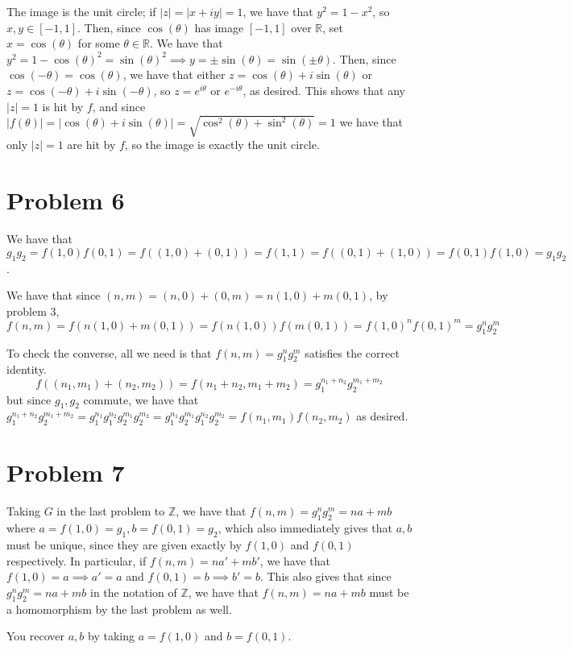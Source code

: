 \documentclass[12pt,letterpaper]{article}
\theoremstyle{definition}
\newcommand{\R}{\mathbb{R}}
\newcommand{\Z}{\mathbb{Z}}
\begin{document}
The image is the unit circle; if $|z| = |x + iy| = 1$, we have that $y^2 = 1 - x^2$, so $x,y \in [-1,1]$. Then, since $\cos(\theta)$ has image $[-1,1]$ over $\R$, set $x = \cos(\theta)$ for some $\theta \in \R$. We have that $y^2 = 1 - \cos(\theta)^2 = \sin(\theta)^2 \implies y = \pm \sin(\theta) = \sin(\pm \theta)$. Then, since $\cos(-\theta) = \cos(\theta)$, we have that either $z = \cos(\theta) + i\sin(\theta)$ or $z = \cos(-\theta) + i\sin(-\theta)$, so $z = e^{i\theta}$ or $e^{-i\theta}$, as desired. This shows that any $|z| = 1$ is hit by $f$, and since $|f(\theta)| = |\cos(\theta) + i\sin(\theta)| = \sqrt{\cos^2(\theta) + \sin^2(\theta)} = 1$ we have that only $|z| = 1$ are hit by $f$, so the image is exactly the unit circle.

\section*{Problem 6}

We have that $g_1g_2 = f(1,0)f(0,1) = f((1,0) + (0,1)) = f(1,1) = f((0,1) + (1,0)) = f(0,1)f(1,0) = g_1g_2$.

We have that since $(n,m) = (n,0) + (0,m) = n(1,0) + m(0,1)$, by problem 3,
\[
  f(n,m) = f(n(1,0) + m(0,1)) = f(n(1,0))f(m(0,1)) = f(1,0)^nf(0,1)^m = g_1^ng_2^m
\]

To check the converse, all we need is that $f(n,m) = g_1^ng_2^m$ satisfies the correct identity.
\[
  f((n_1,m_1) + (n_2, m_2)) = f(n_1 + n_2, m_1 + m_2) = g_1^{n_1+n_2}g_2^{m_1+m_2}
\]
but since $g_1, g_2$ commute, we have that $g_1^{n_1+n_2}g_2^{m_1+m_2} = g_1^{n_1}g_1^{n_2}g_2^{m_1}g_2^{m_2} = g_1^{n_1}g_2^{m_1}g_1^{n_2}g_2^{m_2} = f(n_1,m_1)f(n_2,m_2)$ as desired.

\section*{Problem 7}

Taking $G$ in the last problem to $\Z$, we have that $f(n,m) = g_1^ng_2^m = na + mb$ where $a = f(1,0) = g_{1}, b = f(0,1) = g_{2}$, which also immediately gives that $a, b$ must be unique, since they are given exactly by $f(1,0)$ and $f(0,1)$ respectively. In particular, if $f(n,m) = na' + mb'$, we have that $f(1,0) = a \implies a' = a$ and $f(0,1) = b \implies b' = b$. This also gives that since $g_1^ng_2^m = na + mb$ in the notation of $\Z$, we have that $f(n,m) = na + mb$ must be a homomorphism by the last problem as well.

You recover $a,b$ by taking $a = f(1,0)$ and $b = f(0,1)$.
\end{document}
